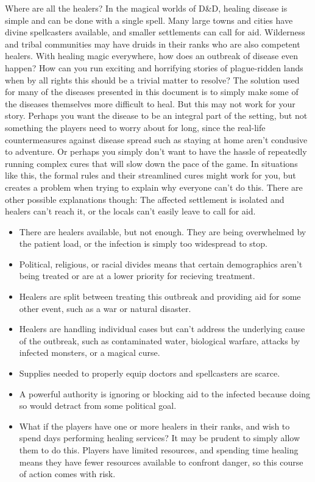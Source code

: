 \documentclass[10pt,a4paper,twoside,twocolumn,openany,bg=print,nodeprecatedcode]{dndbook}
\begin{document}
\begin{DndComment}{Where are all the healers?}
In the magical worlds of D\&D, healing disease is simple and can be done with a single spell. Many large towns and cities have divine spellcasters available, and smaller settlements can call for aid. Wilderness and tribal communities may have druids in their ranks who are also competent healers. With healing magic everywhere, how does an outbreak of disease even happen? How can you run exciting and horrifying stories of plague-ridden lands when by all rights this should be a trivial matter to resolve?
The solution used for many of the diseases presented in this document is to simply make some of the diseases themselves more difficult to heal. But this may not work for your story. Perhaps you want the disease to be an integral part of the setting, but not something the players need to worry about for long, since the real-life countermeasures against disease spread such as staying at home aren't condusive to adventure. Or perhaps you simply don't want to have the hassle of repeatedly running complex cures that will slow down the pace of the game. In situations like this, the formal rules and their streamlined cures might work for you, but creates a problem when trying to explain why everyone can't do this. There are other possible explanations though:
The affected settlement is isolated and healers can't reach it, or the locals can't easily leave to call for aid.

\begin{itemize}
\item There are healers available, but not enough. They are being overwhelmed by the patient load, or the infection is simply too widespread to stop.
\item Political, religious, or racial divides means that certain demographics aren't being treated or are at a lower priority for recieving treatment.
\item Healers are split between treating this outbreak and providing aid for some other event, such as a war or natural disaster.
\item Healers are handling individual cases but can't address the underlying cause of the outbreak, such as contaminated water, biological warfare, attacks by infected monsters, or a magical curse.
\item Supplies needed to properly equip doctors and spellcasters are scarce.
\item A powerful authority is ignoring or blocking aid to the infected because doing so would detract from some political goal.
\item What if the players have one or more healers in their ranks, and wish to spend days performing healing services? It may be prudent to simply allow them to do this. Players have limited resources, and spending time healing means they have fewer resources available to confront danger, so this course of action comes with risk.
\end{itemize}

\end{DndComment}
\end{document}
